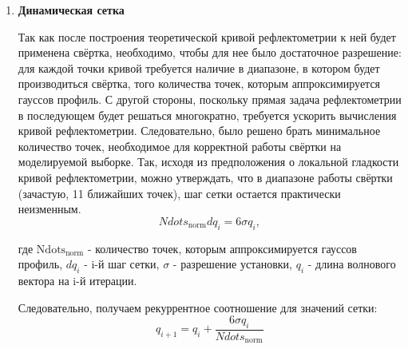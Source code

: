 \documentclass[a4paper]{article}
\begin{document}
\begin{enumerate}
\[\\ \text{ где }
$c_0 = 0, \quad c_{m-1} = 1,   
  0 \le c_1 \le c_2 \le \dots \le c_{m-2} \le 1.$
\]

\[
B_{m-1} (u) = \sum_{k=0}^{m-1} 
c_k \,
\frac{(m-1)!}{k!\,(m-1-k)!} \,
u^{k}\,(1-u)^{\,m-1-k},
\qquad u \in [0,1].
\]

Полином Бернштейна $B_{m-1}$ задан $m$ параметрами, однако, $c_0, c_{m-1}$ фиксированы. Сделано это для соблюдения граничных условий - плотность длины рассеняния в переходных слоях между двумя веществами не может выйти за диапазон плотностей длин рассеяния этих веществ. Остальные параметры заданы неубывающими друг относительно друга с целью соблюдения требования монотонности плотности длины рассеяния в профиле шероховатости. Итого:
\[
\rho(x) = \rho_1 + (\rho_2 - \rho_1)\,B(\frac{x}{rough}).
\]
Для решения обратной задачи рефлектометрии с хорошей точностью оказалось достаточно полинома Бернштейна 7 степени, то есть 6 параметров, отвечающих за форму шероховатости. Позже число коэффициентов Бернштейна было сокращено до 5, то есть 3 параметра, практически без потери в точности решения.  


\item \textbf{Динамическая сетка} 

Так как после построения теоретической кривой рефлектометрии к ней будет применена свёртка, необходимо, чтобы для нее было достаточное разрешение: для каждой точки кривой требуется наличие в диапазоне, в котором будет производиться свёртка, того количества точек, которым аппроксимируется гауссов профиль.
С другой стороны, поскольку прямая задача рефлектометрии в последующем будет решаться многократно, требуется ускорить вычисления кривой рефлектометрии. Следовательно, было решено брать минимальное количество точек, необходимое для корректной работы свёртки на моделируемой выборке.
Так, исходя из предположения о локальной гладкости кривой рефлектометрии, можно утверждать, что в диапазоне работы свёртки (зачастую, 11 ближайших точек), шаг сетки остается практически неизменным.
\begin{equation}
    Ndots_{\text{norm}}dq_i = 6\sigma q_i, %
\end{equation}

где \( \mathrm{Ndots}_{\mathrm{norm}} \) - количество точек, которым аппроксимируется гауссов профиль, 
\( dq_i \) - i-й шаг сетки, 
\( \sigma \) - разрешение установки, 
\( q_i \) - длина волнового вектора на i-й итерации.

Следовательно, получаем рекуррентное соотношение для значений сетки:
\begin{equation}
    q_{i+1} = q_{i} + \frac{6\sigma q_i}{Ndots_{\text{norm}}} %
\end{equation}


\end{enumerate}
\end{document}
